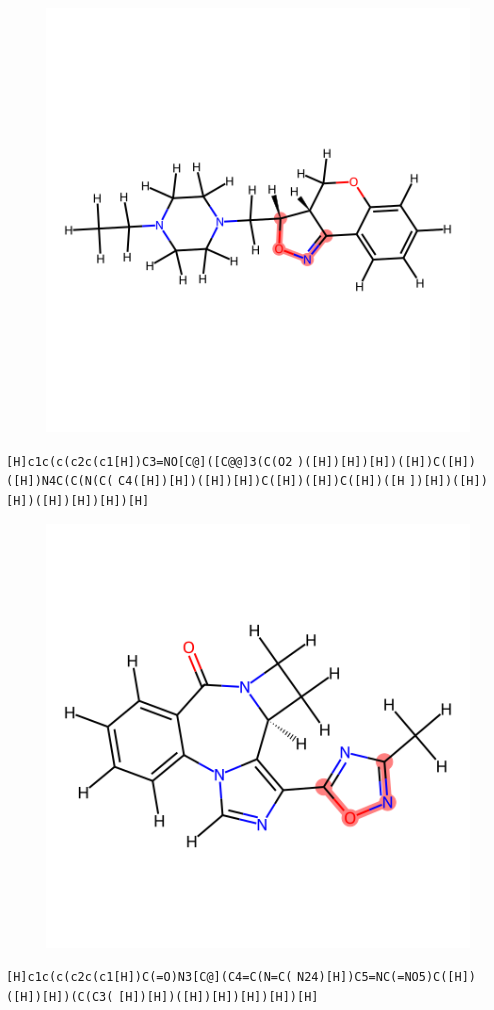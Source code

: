 \documentclass{article}
\begin{document}
\begin{figure}[ht]
\centering
    \includegraphics{mol110.png}
\end{figure}
\verb|[H]c1c(c(c2c(c1[H])C3=NO[C@]([C@@]3(C(O2| \verb|)([H])[H])[H])([H])C([H])([H])N4C(C(N(C(| \verb|C4([H])[H])([H])[H])C([H])([H])C([H])([H| \verb|])[H])([H])[H])([H])[H])[H])[H]|

\begin{figure}[ht]
\centering
    \includegraphics{mol111.png}
\end{figure}
\verb|[H]c1c(c(c2c(c1[H])C(=O)N3[C@](C4=C(N=C(| \verb|N24)[H])C5=NC(=NO5)C([H])([H])[H])(C(C3(| \verb|[H])[H])([H])[H])[H])[H])[H]|
\end{document}
